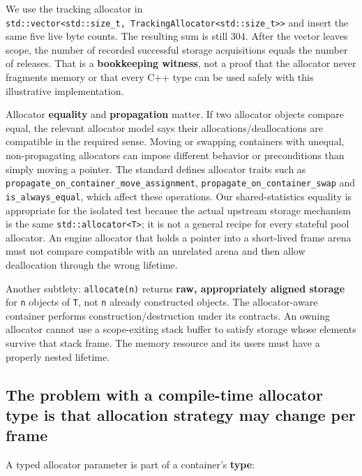 We use the tracking allocator in \texttt{std::vector\textless{}std::size\_t,\ TrackingAllocator\textless{}std::size\_t\textgreater{}\textgreater{}} and insert the same five live byte counts. The resulting sum is still 304. After the vector leaves scope, the number of recorded successful storage acquisitions equals the number of releases. That is a \textbf{bookkeeping witness}, not a proof that the allocator never fragments memory or that every C++ type can be used safely with this illustrative implementation.

Allocator \textbf{equality} and \textbf{propagation} matter. If two allocator objects compare equal, the relevant allocator model says their allocations/deallocations are compatible in the required sense. Moving or swapping containers with unequal, non-propagating allocators can impose different behavior or preconditions than simply moving a pointer. The standard defines allocator traits such as \texttt{propagate\_on\_container\_move\_assignment}, \texttt{propagate\_on\_container\_swap} and \texttt{is\_always\_equal}, which affect these operations. Our shared-statistics equality is appropriate for the isolated test because the actual upstream storage mechanism is the same \texttt{std::allocator\textless{}T\textgreater{}}; it is not a general recipe for every stateful pool allocator. An engine allocator that holds a pointer into a short-lived frame arena must not compare compatible with an unrelated arena and then allow deallocation through the wrong lifetime.

Another subtlety: \texttt{allocate(n)} returns \textbf{raw, appropriately aligned storage} for \texttt{n} objects of \texttt{T}, not \texttt{n} already constructed objects. The allocator-aware container performs construction/destruction under its contracts. An owning allocator cannot use a scope-exiting stack buffer to satisfy storage whose elements survive that stack frame. The memory resource and its users must have a properly nested lifetime.

\subsection{The problem with a compile-time allocator type is that allocation strategy may change per frame}\label{05-engine-i-ch006-the-problem-with-a-compile-time-allocator-type-is-that-allocation-strategy-may-change-per-frame}

A typed allocator parameter is part of a container's \textbf{type}:

